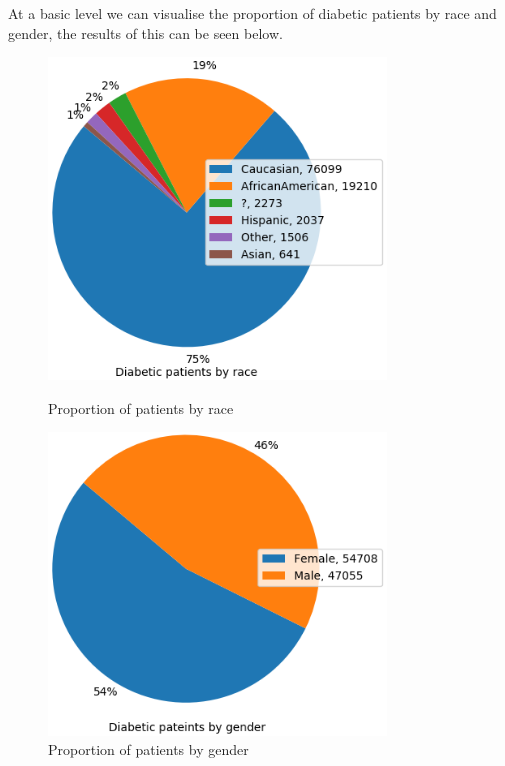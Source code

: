 \documentclass[11pt]{report}
\newcommand{\linespace}{\vspace{0.3cm}\noindent}
\begin{document}
\linespace
At a basic level we can visualise the proportion of diabetic patients by race and gender, the results of this can be seen below.

\begin{figure}[ht]
	\begin{minipage}[b]{.4\textwidth}
	\centering
	\includegraphics[width=0.8\textwidth]{race_pie.png}
	\caption{Proportion of patients by race}
	\end{minipage}
	\hfill
	\begin{minipage}[b]{.4\textwidth}
	\centering
	\includegraphics[width=0.8\textwidth]{gender_pie.png}
\caption{Proportion of patients by gender}
\end{minipage}
\end{figure}
\end{document}
